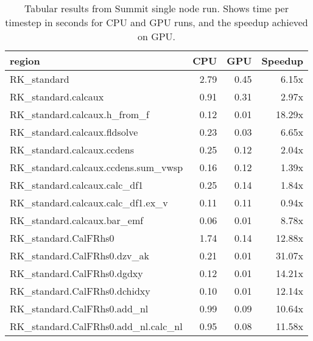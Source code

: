 \begin{table*}[htb]
  \centering
  \begin{tabular}{|l|rrr|}
  \hline
  region & CPU & GPU & Speedup \\
  \hline
  RK{\_}standard                                          &   2.79 &  0.45 &  6.15x \\
  RK{\_}standard.calcaux                                  &   0.91 &  0.31 &  2.97x \\
  RK{\_}standard.calcaux.h{\_}from{\_}f                   &   0.12 &  0.01 & 18.29x \\
  RK{\_}standard.calcaux.fldsolve                         &   0.23 &  0.03 &  6.65x \\
  RK{\_}standard.calcaux.ccdens                           &   0.25 &  0.12 &  2.04x \\
  RK{\_}standard.calcaux.ccdens.sum{\_}vwsp               &   0.16 &  0.12 &  1.39x \\
  RK{\_}standard.calcaux.calc{\_}df1                      &   0.25 &  0.14 &  1.84x \\
  RK{\_}standard.calcaux.calc{\_}df1.ex{\_}v              &   0.11 &  0.11 &  0.94x \\
  RK{\_}standard.calcaux.bar{\_}emf                       &   0.06 &  0.01 &  8.78x \\
  RK{\_}standard.CalFRhs0                                 &   1.74 &  0.14 & 12.88x \\
  RK{\_}standard.CalFRhs0.dzv{\_}ak                       &   0.21 &  0.01 & 31.07x \\
  RK{\_}standard.CalFRhs0.dgdxy                           &   0.12 &  0.01 & 14.21x \\
  RK{\_}standard.CalFRhs0.dchidxy                         &   0.10 &  0.01 & 12.14x \\
  RK{\_}standard.CalFRhs0.add{\_}nl                       &   0.99 &  0.09 & 10.64x \\
  RK{\_}standard.CalFRhs0.add{\_}nl.calc{\_}nl            &   0.95 &  0.08 & 11.58x \\
  \hline
  \end{tabular}
  \caption{Tabular results from Summit single node run. Shows time per timestep in seconds for CPU and GPU runs, and the speedup achieved on GPU.}
  \label{tab:single_node}
\end{table*}
